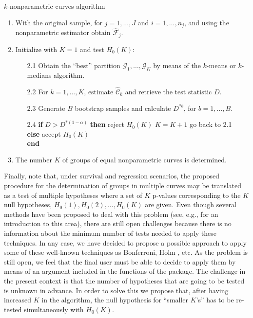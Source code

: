 \begin{algorithm}
\caption{$k$-nonparametric curves  algorithm}\label{algo1}

\begin{enumerate}

\item  With the original sample, for $j = 1, \ldots, J$ and $i=1, \ldots, n_j$,   and using the nonparametric estimator obtain $\widehat{\mathcal{F}}_j$.


\item Initialize with $K = 1$ and test $H_0(K)$:
\begin{enumerate}
\item[2.1] Obtain the ``best'' partition $\mathcal{G}_1, \ldots, \mathcal{G}_K$ by means of the $k$-means or $k$-medians algorithm.

\item[2.2] For $k = 1, \ldots, K$, estimate $\widehat{\mathcal{C}}_k$ and retrieve the test statistic $D$.

\item[2.3] Generate $B$ bootstrap samples and calculate $D^{\ast b}$, for $b = 1, \ldots, B$.

\item[2.4] \textbf{if} $D > D^{\ast (1-\alpha)}$ \textbf{then} 
	\subitem reject $H_0(K)$
	\subitem $K = K + 1$
	\subitem go back to 2.1 \\ 
	\textbf{else}
	\subitem accept $H_0(K)$\\
	\textbf{end}
	
	\end{enumerate}
	
\item The number $K$ of groups of  equal nonparametric curves is determined.

\end{enumerate}
	

\end{algorithm}
	
Finally, note that, under survival and regression scenarios, the proposed procedure for the determination of groups in multiple  curves may be translated as a test of multiple hypotheses where a set of  $K$ p-values corresponding to the $K$ null hypotheses, $H_0(1), H_0(2), \ldots, H_0(K)$ are given. Even though several methods have been proposed to deal with this problem (see, e.g., \cite{Dudoit} for an introduction to this area), there are still open challenges because there is no information about the minimum number of tests needed to apply these techniques. In any case, we have decided to propose a possible approach to apply some of these well-known techniques as Bonferroni, Holm \citep{citeulike:4294367}, etc. As the problem is still open, we feel that the final user must be able to decide to apply them by means of an argument included in the functions of the package.  The challenge in the present context is that the number of hypotheses that are going to be tested is unknown in advance. In order to solve this we propose that, after having increased $K$ in the algorithm, the null hypothesis for ``smaller $K$'s'' has to be re-tested simultaneously with $H_0(K)$. 




